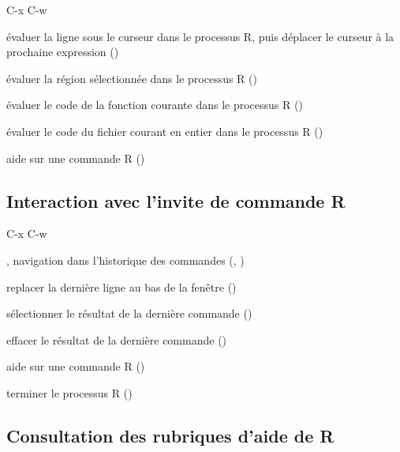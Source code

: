 \begin{ttscript}{C-x C-w}
  \raggedright
\item[\ess{C-c C-n}] évaluer la ligne sous le curseur dans le
  processus R, puis déplacer le curseur à la prochaine expression
  ()
\item[\ess{C-c C-r}] évaluer la région sélectionnée dans le processus
  R ()
\item[\ess{C-c C-f}] évaluer le code de la fonction courante dans
  le processus R ()
\item[\ess{C-c C-l}] évaluer le code du fichier courant en entier dans
  le processus R ()
\item[\ess{C-c C-v}] aide sur une commande R
  ()
\end{ttscript}

\subsection{Interaction avec l'invite de commande R}
\label{emacs+ess:commandes:invite}

\begin{ttscript}{C-x C-w}
  \raggedright
\item[\ess{M-p}, \ess{M-n}] navigation dans l'historique des
  commandes (,
  )
\item[\ess{C-c C-e}] replacer la dernière ligne au bas de la fenêtre
  ()
\item[\ess{M-h}] sélectionner le résultat de la dernière commande
  ()
\item[\ess{C-c C-o}] effacer le résultat de la dernière commande
  ()
\item[\ess{C-c C-v}] aide sur une commande R
  ()
\item[\ess{C-c C-q}] terminer le processus R ()
\end{ttscript}

\subsection{Consultation des rubriques d'aide de R}
\label{emacs+ess:commandes:aide}

